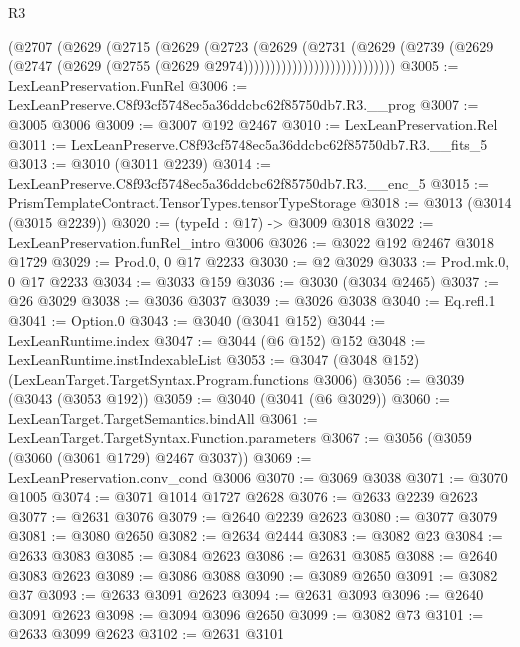 \begin{lexlean}{R3}
\begin{coremodule}
                                (@2707
                                  (@2629
                                    (@2715
                                      (@2629
                                        (@2723
                                          (@2629
                                            (@2731
                                              (@2629
                                                (@2739
                                                  (@2629
                                                    (@2747
                                                      (@2629
                                                        (@2755
                                                          (@2629 @2974))))))))))))))))))))))))))))
@3005 := LexLeanPreservation.FunRel
@3006 := LexLeanPreserve.C8f93cf5748ec5a36ddcbc62f85750db7.R3.__prog
@3007 := @3005 @3006
@3009 := @3007 @192 @2467
@3010 := LexLeanPreservation.Rel
@3011 := LexLeanPreserve.C8f93cf5748ec5a36ddcbc62f85750db7.R3.__fits_5
@3013 := @3010 (@3011 @2239)
@3014 := LexLeanPreserve.C8f93cf5748ec5a36ddcbc62f85750db7.R3.__enc_5
@3015 := PrismTemplateContract.TensorTypes.tensorTypeStorage
@3018 := @3013 (@3014 (@3015 @2239))
@3020 := (typeId : @17) -> @3009 @3018
@3022 := LexLeanPreservation.funRel_intro @3006
@3026 := @3022 @192 @2467 @3018 @1729
@3029 := Prod.{0, 0} @17 @2233
@3030 := @2 @3029
@3033 := Prod.mk.{0, 0} @17 @2233
@3034 := @3033 @159
@3036 := @3030 (@3034 @2465)
@3037 := @26 @3029
@3038 := @3036 @3037
@3039 := @3026 @3038
@3040 := Eq.refl.{1}
@3041 := Option.{0}
@3043 := @3040 (@3041 @152)
@3044 := LexLeanRuntime.index
@3047 := @3044 (@6 @152) @152
@3048 := LexLeanRuntime.instIndexableList
@3053 := @3047 (@3048 @152) (LexLeanTarget.TargetSyntax.Program.functions @3006)
@3056 := @3039 (@3043 (@3053 @192))
@3059 := @3040 (@3041 (@6 @3029))
@3060 := LexLeanTarget.TargetSemantics.bindAll
@3061 := LexLeanTarget.TargetSyntax.Function.parameters
@3067 := @3056 (@3059 (@3060 (@3061 @1729) @2467 @3037))
@3069 := LexLeanPreservation.conv_cond @3006
@3070 := @3069 @3038
@3071 := @3070 @1005
@3074 := @3071 @1014 @1727 @2628
@3076 := @2633 @2239 @2623
@3077 := @2631 @3076
@3079 := @2640 @2239 @2623
@3080 := @3077 @3079
@3081 := @3080 @2650
@3082 := @2634 @2444
@3083 := @3082 @23
@3084 := @2633 @3083
@3085 := @3084 @2623
@3086 := @2631 @3085
@3088 := @2640 @3083 @2623
@3089 := @3086 @3088
@3090 := @3089 @2650
@3091 := @3082 @37
@3093 := @2633 @3091 @2623
@3094 := @2631 @3093
@3096 := @2640 @3091 @2623
@3098 := @3094 @3096 @2650
@3099 := @3082 @73
@3101 := @2633 @3099 @2623
@3102 := @2631 @3101

\end{coremodule}
\end{lexlean}
